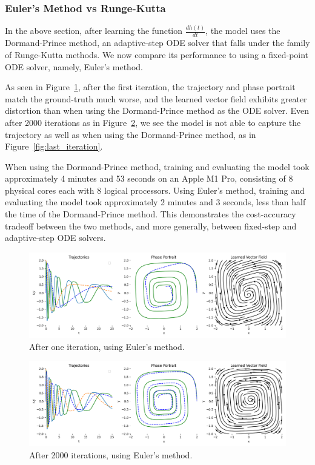 \documentclass[11pt]{article}
\begin{document}
\subsubsection{Euler's Method vs Runge-Kutta}

In the above section, after learning the function $\frac{dh(t)}{dt}$, the model uses the Dormand-Prince method, an adaptive-step ODE solver that falls under the family of Runge-Kutta methods. We now compare its performance to using a fixed-point ODE solver, namely, Euler's method.

As seen in Figure~\ref{fig:first_iteration_euler}, after the first iteration, the trajectory and phase portrait match the ground-truth much worse, and the learned vector field exhibits greater distortion than when using the Dormand-Prince method as the ODE solver. Even after 2000 iterations as in Figure~\ref{fig:last_iteration_euler}, we see the model is not able to capture the trajectory as well as when using the Dormand-Prince method, as in Figure~\ref{fig:last_iteration}.

When using the Dormand-Prince method, training and evaluating the model took approximately 4 minutes and 53 seconds on an Apple M1 Pro, consisting of 8 physical cores each with 8 logical processors. Using Euler's method, training and evaluating the model took approximately 2 minutes and 3 seconds, less than half the time of the Dormand-Prince method. This demonstrates the cost-accuracy tradeoff between the two methods, and more generally, between fixed-step and adaptive-step ODE solvers.


\begin{figure}
  \centering
  \includegraphics*[width=\linewidth]{000_euler.png}
  \caption{After one iteration, using Euler's method.}
  \label{fig:first_iteration_euler}
\end{figure}

\begin{figure}
  \centering
  \includegraphics*[width=\linewidth]{099_euler.png}
  \caption{After 2000 iterations, using Euler's method.}
  \label{fig:last_iteration_euler}
\end{figure}
\end{document}
